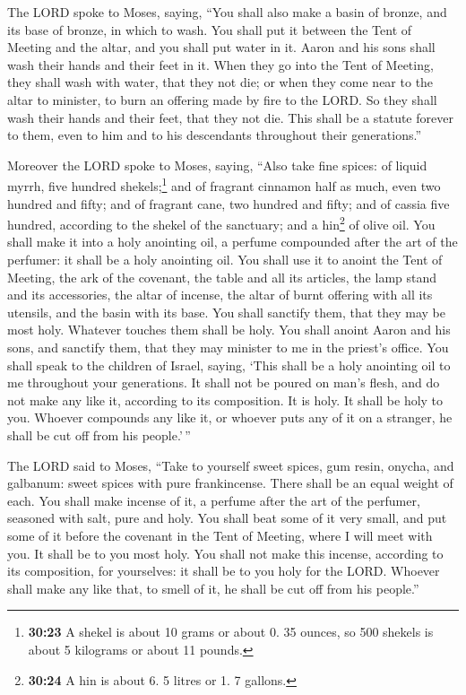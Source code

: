  The LORD spoke to Moses, saying,  ``You
shall also make a basin of bronze, and its base of bronze, in which to
wash. You shall put it between the Tent of Meeting and the altar, and
you shall put water in it.  Aaron and his sons shall wash
their hands and their feet in it.  When they go into the
Tent of Meeting, they shall wash with water, that they not die; or when
they come near to the altar to minister, to burn an offering made by
fire to the LORD.  So they shall wash their hands and
their feet, that they not die. This shall be a statute forever to them,
even to him and to his descendants throughout their generations.''

 Moreover the LORD spoke to Moses, saying,
 ``Also take fine spices: of liquid myrrh, five hundred
shekels;\footnote{\textbf{30:23} A shekel is about 10 grams or about 0.
  35 ounces, so 500 shekels is about 5 kilograms or about 11 pounds.}
and of fragrant cinnamon half as much, even two hundred and fifty; and
of fragrant cane, two hundred and fifty;  and of cassia
five hundred, according to the shekel of the sanctuary; and a
hin\footnote{\textbf{30:24} A hin is about 6. 5 litres or 1. 7 gallons.}
of olive oil.  You shall make it into a holy anointing
oil, a perfume compounded after the art of the perfumer: it shall be a
holy anointing oil.  You shall use it to anoint the Tent
of Meeting, the ark of the covenant,  the table and all
its articles, the lamp stand and its accessories, the altar of incense,
 the altar of burnt offering with all its utensils, and
the basin with its base.  You shall sanctify them, that
they may be most holy. Whatever touches them shall be holy.
 You shall anoint Aaron and his sons, and sanctify them,
that they may minister to me in the priest's office.  You
shall speak to the children of Israel, saying, `This shall be a holy
anointing oil to me throughout your generations.  It
shall not be poured on man's flesh, and do not make any like it,
according to its composition. It is holy. It shall be holy to you.
 Whoever compounds any like it, or whoever puts any of it
on a stranger, he shall be cut off from his people.'\,''

 The LORD said to Moses, ``Take to yourself sweet spices,
gum resin, onycha, and galbanum: sweet spices with pure frankincense.
There shall be an equal weight of each.  You shall make
incense of it, a perfume after the art of the perfumer, seasoned with
salt, pure and holy.  You shall beat some of it very
small, and put some of it before the covenant in the Tent of Meeting,
where I will meet with you. It shall be to you most holy.
 You shall not make this incense, according to its
composition, for yourselves: it shall be to you holy for the LORD.
 Whoever shall make any like that, to smell of it, he
shall be cut off from his people.''

